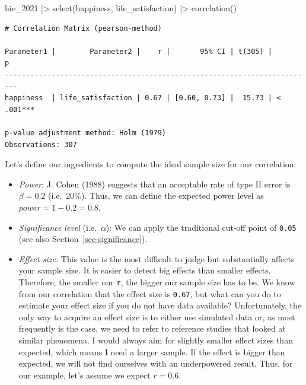 \documentclass[
  letterpaper,
  DIV=11,
  numbers=noendperiod]{scrreprt}
\newenvironment{Shaded}{\begin{snugshade}}{\end{snugshade}}
\newcommand{\FunctionTok}[1]{\textcolor[rgb]{0.28,0.35,0.67}{#1}}
\newcommand{\NormalTok}[1]{\textcolor[rgb]{0.00,0.23,0.31}{#1}}
\newcommand{\SpecialCharTok}[1]{\textcolor[rgb]{0.37,0.37,0.37}{#1}}
\begin{document}
\begin{Shaded}
\begin{Highlighting}[]
\NormalTok{hie\_2021 }\SpecialCharTok{|\textgreater{}}
  \FunctionTok{select}\NormalTok{(happiness, life\_satisfaction) }\SpecialCharTok{|\textgreater{}}
  \FunctionTok{correlation}\NormalTok{()}
\end{Highlighting}
\end{Shaded}

\begin{verbatim}
# Correlation Matrix (pearson-method)

Parameter1 |        Parameter2 |    r |       95% CI | t(305) |         p
-------------------------------------------------------------------------
happiness  | life_satisfaction | 0.67 | [0.60, 0.73] |  15.73 | < .001***

p-value adjustment method: Holm (1979)
Observations: 307
\end{verbatim}

Let's define our ingredients to compute the ideal sample size for our
correlation:

\begin{itemize}
\item
  \emph{Power}: J. Cohen (1988) suggests that an acceptable rate of type
  II error is \(\beta = 0.2\) (i.e.~20\%). Thus, we can define the
  expected power level as \(power = 1 - 0.2 = 0.8\).
\item
  \emph{Significance level} (i.e.~\(\alpha\)): We can apply the
  traditional cut-off point of \texttt{0.05} (see also
  Section~\ref{sec-significance}).
\item
  \emph{Effect size:} This value is the most difficult to judge but
  substantially affects your sample size. It is easier to detect big
  effects than smaller effects. Therefore, the smaller our \texttt{r},
  the bigger our sample size has to be. We know from our correlation
  that the effect size is \texttt{0.67}, but what can you do to estimate
  your effect size if you do not have data available? Unfortunately, the
  only way to acquire an effect size is to either use simulated data or,
  as most frequently is the case, we need to refer to reference studies
  that looked at similar phenomena. I would always aim for slightly
  smaller effect sizes than expected, which means I need a larger
  sample. If the effect is bigger than expected, we will not find
  ourselves with an underpowered result. Thus, for our example, let's
  assume we expect \(r = 0.6\).
\end{itemize}
\end{document}
